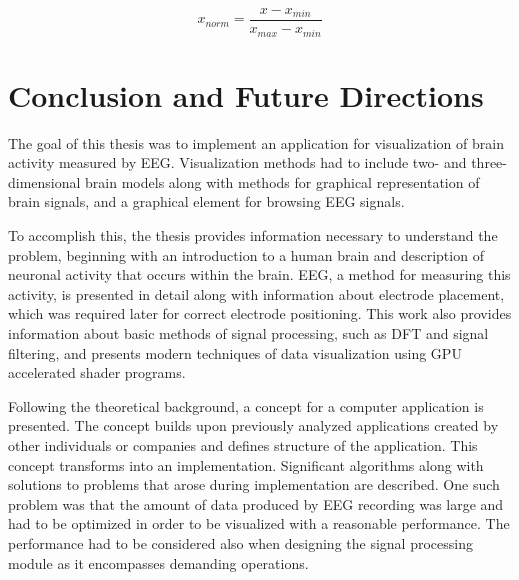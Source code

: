 \begin{equation}
\label{eq:xNorm}
x_{norm} = \frac{x - x_{min}}{x_{max} - x_{min}}
\end{equation}


\chapter{Conclusion and Future Directions}
The goal of this thesis was to implement an application for visualization of brain activity measured by EEG. Visualization methods had to include two- and three-dimensional brain models along with methods for graphical representation of brain signals, and a graphical element for browsing EEG signals.   

To accomplish this, the thesis provides information necessary to understand the problem, beginning with an introduction to a human brain and description of neuronal activity that occurs within the brain. EEG, a method for measuring this activity, is presented in detail along with information about electrode placement, which was required later for correct electrode positioning. This work also provides information about basic methods of signal processing, such as DFT and signal filtering, and presents modern techniques of data visualization using GPU accelerated shader programs.

Following the theoretical background, a concept for a computer application is presented. The concept builds upon previously analyzed applications created by other individuals or companies and defines structure of the application. This concept transforms into an implementation. Significant algorithms along with solutions to problems that arose during implementation are described. One such problem was that the amount of data produced by EEG recording was large and had to be optimized in order to be visualized with a reasonable performance. The performance had to be considered also when designing the signal processing module as it encompasses demanding operations.

